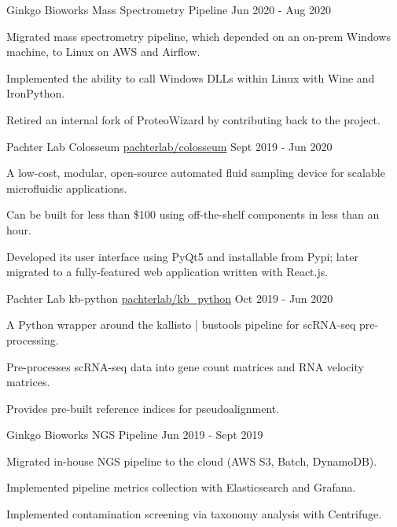 \begin{cventries}
\cventry
  {Ginkgo Bioworks} %
  {Mass Spectrometry Pipeline} %
  {} %
  {Jun 2020 - Aug 2020} %
  {
    \begin{cvitems} %
      \item {Migrated mass spectrometry pipeline, which depended on an on-prem Windows machine, to Linux on AWS and Airflow.}
      \item {Implemented the ability to call Windows DLLs within Linux with Wine and IronPython.}
      \item {Retired an internal fork of ProteoWizard by contributing back to the project.}
    \end{cvitems}
  }

\cventry
  {Pachter Lab} %
  {Colosseum} %
  {\faGithub\phantom{a}\href{https://github.com/pachterlab/colosseum}{pachterlab/colosseum}} %
  {Sept 2019 - Jun 2020} %
  {
    \begin{cvitems} %
      \item {A low-cost, modular, open-source automated fluid sampling device for scalable microfluidic applications.}
      \item {Can be built for less than \$100 using off-the-shelf components in less than an hour.}
      \item {Developed its user interface using PyQt5 and installable from Pypi; later migrated to a fully-featured web application written with React.js.}
    \end{cvitems}
  }

\cventry
  {Pachter Lab} %
  {kb-python} %
  {\faGithub\phantom{a}\href{https://github.com/pachterlab/kb_python}{pachterlab/kb\_python}} %
  {Oct 2019 - Jun 2020} %
  {
    \begin{cvitems} %
      \item {A Python wrapper around the kallisto | bustools pipeline for scRNA-seq pre-processing.}
      \item {Pre-processes scRNA-seq data into gene count matrices and RNA velocity matrices.}
      \item {Provides pre-built reference indices for pseudoalignment.}
    \end{cvitems}
  }

\cventry
  {Ginkgo Bioworks}
  {NGS Pipeline}
  {}
  {Jun 2019 - Sept 2019}
  {
   \begin{cvitems} %
     \item {Migrated in-house NGS pipeline to the cloud (AWS S3, Batch, DynamoDB).}
     \item {Implemented pipeline metrics collection with Elasticsearch and Grafana.}
     \item {Implemented contamination screening via taxonomy analysis with Centrifuge.}
    \end{cvitems}
  }


\end{cventries}

